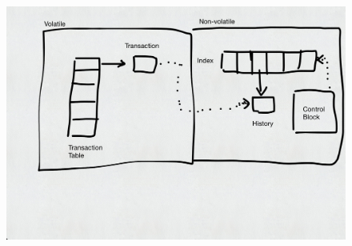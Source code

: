 \begin{figure}[!ht]
    \centering
    \includegraphics[width=\textwidth]{figures/drafts/concept-struct-complete.pdf}
    \caption{}
    \label{fig:concept-struct-complete}
\end{figure}
